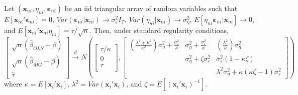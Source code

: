 \begin{thm}
\label{thm:OLSvsMG}
Let $\left( \mathbf{x}_{ni},\eta_{ni}, \boldsymbol{\varepsilon}_{ni} \right)$ be an iid triangular array of random variables such that $E[\mathbf{x}_{ni}'\boldsymbol{\varepsilon}_{ni}] =0$, $Var(\boldsymbol{\varepsilon}_{ni}|\mathbf{x}_{ni}) \rightarrow \sigma_{\varepsilon}^2 I_T$, $Var(\eta_{ni}|\mathbf{x}_{ni}) \rightarrow \sigma_{\eta}^2$, $E[\eta_{ni} \boldsymbol{\varepsilon}_{ni}|\mathbf{x}_{ni}] \rightarrow 0$, and $E[\mathbf{x}_{ni}'\mathbf{x}_{ni}\eta_{ni}] = \tau/\sqrt{n}$.
Then, under standard regularity conditions, 
\[
  \left[\begin{array}{c}
\sqrt{n} (\widehat{\beta}_{OLS} - \beta)\\
\sqrt{n} (\widehat{\beta}_{MG} - \beta)\\
\widehat{\tau}
\end{array}\right] \overset{d}{\rightarrow} N \left( 
\left[\begin{array}{c}
\tau/\kappa \\
0  \\
\tau\\
\end{array}\right],  
\left[
\begin{array}{ccc}
  \displaystyle\left(\frac{\lambda^2 + \kappa^2}{\kappa^2}\right)\sigma_\eta^2 + \frac{\sigma_\varepsilon^2}{\kappa} & \displaystyle \sigma_\eta^2 + \frac{\sigma_\varepsilon^2}{\kappa} &\displaystyle\left(\frac{\lambda^2}{\kappa}\right)\sigma_\eta^2  \\
  & \sigma_{\eta}^2 + \zeta \sigma_\varepsilon^2 & \sigma_{\varepsilon}^2 (1 - \kappa\zeta) \\
   &  & \lambda^2 \sigma_\eta^2 + \kappa(\kappa\zeta - 1) \sigma_\varepsilon^2 
\end{array}
\right]\right)
\]
where $\kappa = E[\mathbf{x}_i' \mathbf{x}_i]$, $\lambda^2 = Var\left( \mathbf{x}_i'\mathbf{x}_i \right)$, and $\zeta = E\left[ \left( \mathbf{x}_i' \mathbf{x}_i \right)^{-1} \right]$.  
\end{thm}


